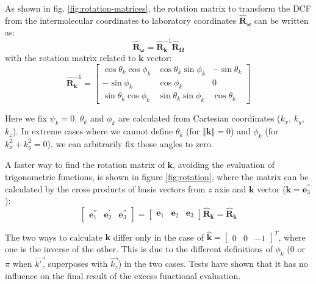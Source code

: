 As shown in fig. \ref{fig:rotation-matrices}, the rotation matrix
to transform the \acs{DCF} from the intermolecular coordinates to
laboratory coordinates $\mathbf{\hat{R}}_{\boldsymbol{\omega}}$ can
be written as:
\begin{equation}
\mathbf{\hat{R}}_{\boldsymbol{\omega}}=\mathbf{\hat{R}}_{\mathbf{k}}^{-1}\mathbf{\hat{R}}_{\mathbf{\Omega}}\label{eq:rot-matrix}
\end{equation}
with the rotation matrix related to $\mathbf{k}$ vector:
\begin{equation}
\mathbf{\hat{R}}_{\mathbf{k}}^{-1}=\left[\begin{array}{ccc}
\cos\theta_{k}\cos\phi_{k} & \cos\theta_{k}\sin\phi_{k} & -\sin\theta_{k}\\
-\sin\phi_{k} & \cos\phi_{k} & 0\\
\sin\theta_{k}\cos\phi_{k} & \sin\theta_{k}\sin\phi_{k} & \cos\theta_{k}
\end{array}\right]
\end{equation}

Here we fix $\psi_{k}=0$. $\theta_{k}$ and $\phi_{k}$ are calculated
from Cartesian coordinates ($k_{x}$, $k_{y}$, $k_{z}$). In
extreme cases where we cannot define $\theta_{k}$ (for $\left\Vert \mathbf{k}\right\Vert =0$)
and $\phi_{k}$ (for $k_{x}^{2}+k_{y}^{2}=0$), we can arbitrarily
fix those angles to zero.

A faster way to find the rotation matrix of $\mathbf{k}$, avoiding
the evaluation of trigonometric functions, is shown in figure \ref{fig:rotation},
where the matrix can be calculated by the cross products of basis
vectors from $z$ axis and $\mathbf{k}$ vector ($\mathbf{k}=\mathbf{e}_{3}^{''}$):
\begin{equation}
\left[\begin{array}{ccc}
\mathbf{e}_{1}^{''} & \mathbf{e}_{2}^{'} & \mathbf{e}_{3}^{''}\end{array}\right]=\left[\begin{array}{ccc}
\mathbf{e}_{1} & \mathbf{e}_{2} & \mathbf{e}_{3}\end{array}\right]\mathbf{\hat{R}_{k}}=\mathbf{\hat{R}_{k}}
\end{equation}

The two ways to calculate $\mathbf{k}$ differ only in the case of
$\hat{\mathbf{k}}=\left[\begin{array}{ccc}
0 & 0 & -1\end{array}\right]^{T}$, where one is the inverse of the other. This is due to the different
definitions of $\phi_{k}$ ($0$ or $\pi$ when $\overrightarrow{k'_{z}}$
superposes with $\overrightarrow{k_{z}}$) in the two cases. Tests
have shown that it has no influence on the final result of the excess
functional evaluation.

